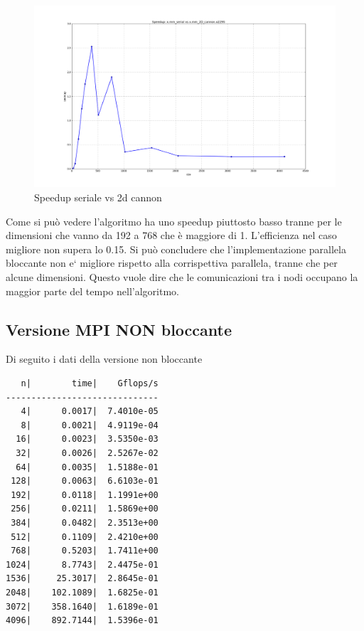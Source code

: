 \begin{figure}[htbp]
    \begin{center}
        \includegraphics[width=15cm]{immagini/speedup_serial_2d_cannon.png}
    \end{center}
    \caption{Speedup seriale vs 2d cannon}
    \label{fig:speedup_serial_2d_cannon}
\end{figure}

Come si pu\`{o} vedere l'algoritmo ha uno speedup piuttosto basso tranne per le dimensioni che vanno da 192 a 768 che \`{e} maggiore di 1.
L'efficienza nel caso migliore non supera lo 0.15. Si pu\`{o} concludere che l'implementazione parallela bloccante non e` migliore rispetto alla corrispettiva parallela, tranne che per alcune dimensioni. Questo vuole dire che le comunicazioni tra i nodi occupano la maggior parte del tempo nell'algoritmo.

\subsection{Versione MPI NON bloccante}

Di seguito i dati della versione non bloccante

\begin{lstlisting}
   n|        time|    Gflops/s
------------------------------
   4|      0.0017|  7.4010e-05
   8|      0.0021|  4.9119e-04
  16|      0.0023|  3.5350e-03
  32|      0.0026|  2.5267e-02
  64|      0.0035|  1.5188e-01
 128|      0.0063|  6.6103e-01
 192|      0.0118|  1.1991e+00
 256|      0.0211|  1.5869e+00
 384|      0.0482|  2.3513e+00
 512|      0.1109|  2.4210e+00
 768|      0.5203|  1.7411e+00
1024|      8.7743|  2.4475e-01
1536|     25.3017|  2.8645e-01
2048|    102.1089|  1.6825e-01
3072|    358.1640|  1.6189e-01
4096|    892.7144|  1.5396e-01
\end{lstlisting}

